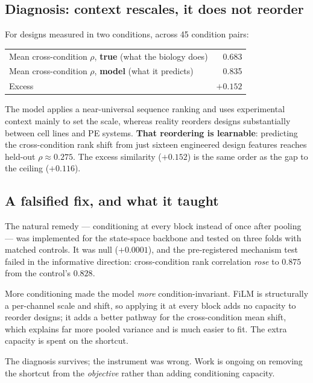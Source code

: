 \documentclass[11pt]{article}
\begin{document}
\subsection{Diagnosis: context rescales, it does not reorder}

For designs measured in two conditions, across 45 condition pairs:

\begin{center}
\begin{tabular}{lr}
\toprule
Mean cross-condition $\rho$, \textbf{true} (what the biology does) & 0.683 \\
Mean cross-condition $\rho$, \textbf{model} (what it predicts) & 0.835 \\
Excess & $\mathbf{+0.152}$ \\
\bottomrule
\end{tabular}
\end{center}

The model applies a near-universal sequence ranking and uses experimental context
mainly to set the scale, whereas reality reorders designs substantially between cell
lines and PE systems. \textbf{That reordering is learnable}: predicting the
cross-condition rank shift from just sixteen engineered design features reaches
held-out $\rho \approx 0.275$. The excess similarity ($+0.152$) is the same order as
the gap to the ceiling ($+0.116$).

\subsection{A falsified fix, and what it taught}

The natural remedy --- conditioning at every block instead of once after pooling ---
was implemented for the state-space backbone and tested on three folds with matched
controls. It was null ($+0.0001$), and the pre-registered mechanism test failed in the
informative direction: cross-condition rank correlation \emph{rose} to $0.875$ from the
control's $0.828$.

More conditioning made the model \emph{more} condition-invariant. FiLM is structurally
a per-channel scale and shift, so applying it at every block adds no capacity to
reorder designs; it adds a better pathway for the cross-condition mean shift, which
explains far more pooled variance and is much easier to fit. The extra capacity is
spent on the shortcut.

The diagnosis survives; the instrument was wrong. Work is ongoing on removing the
shortcut from the \emph{objective} rather than adding conditioning capacity.
\end{document}
